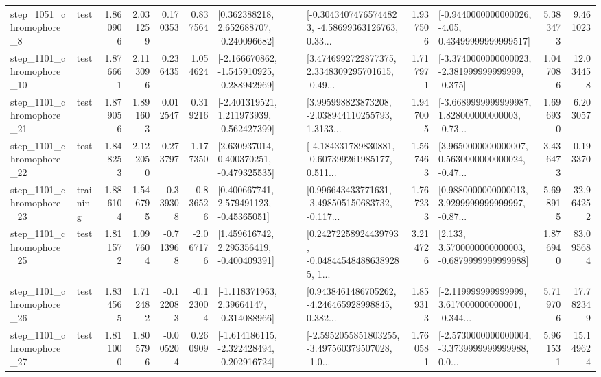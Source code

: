 \begin{tabular}{llrrrrllrlrr}
  step\_1051\_chromophore\_8 &      test &      1.860906 &    2.031259 &      0.170353 &  0.837564 &    [0.362388218, 2.652688707, -0.240096682] &  [-0.30434074765744823, -4.58699363126763, 0.33... &       1.937506 &  [-0.9440000000000026, -4.05, 0.43499999999999517] &            5.383473 &          9.461023 \\
 step\_1101\_chromophore\_10 &      test &      1.876661 &    2.113096 &      0.236435 &  1.054624 &  [-2.166670862, -1.545910925, -0.288942969] &  [3.4746992722877375, 2.3348309295701615, -0.49... &       1.717971 &  [-3.3740000000000023, -2.381999999999999, -0.375] &            1.047086 &         12.034458 \\
 step\_1101\_chromophore\_21 &      test &      1.879056 &    1.891603 &      0.012547 &  0.319216 &   [-2.401319521, 1.211973939, -0.562427399] &  [3.995998823873208, -2.038944110255793, 1.3133... &       1.947005 &  [-3.6689999999999987, 1.828000000000003, -0.73... &            1.696930 &          6.203057 \\
 step\_1101\_chromophore\_22 &      test &      1.848253 &    2.122050 &      0.273797 &  1.177350 &    [2.630937014, 0.400370251, -0.479325535] &  [-4.184331789830881, -0.607399261985177, 0.511... &       1.567463 &  [3.9650000000000007, 0.5630000000000024, -0.47... &            3.436473 &          0.193370 \\
 step\_1101\_chromophore\_23 &  training &      1.886104 &    1.546795 &     -0.339308 & -0.836526 &     [0.400667741, 2.579491123, -0.45365051] &  [0.996643433771631, -3.498505150683732, -0.117... &       1.767233 &  [0.9880000000000013, 3.9299999999999997, -0.87... &            5.698915 &         32.964252 \\
 step\_1101\_chromophore\_25 &      test &      1.811572 &    1.097604 &     -0.713968 & -2.067176 &    [1.459616742, 2.295356419, -0.400409391] &  [0.24272258924439793, -0.048445484886389285, 1... &       3.214726 &   [2.133, 3.5700000000000003, -0.6879999999999988] &            1.876940 &         83.095684 \\
 step\_1101\_chromophore\_26 &      test &      1.834565 &    1.712482 &     -0.122083 & -0.123004 &    [-1.118371963, 2.39664147, -0.314088966] &  [0.9438461486705262, -4.246465928998845, 0.382... &       1.859313 &  [-2.119999999999999, 3.617000000000001, -0.344... &            5.719706 &         17.782349 \\
 step\_1101\_chromophore\_27 &      test &      1.811000 &    1.805796 &     -0.005204 &  0.260909 &  [-1.614186115, -2.322428494, -0.202916724] &  [-2.5952055851803255, -3.497560379507028, -1.0... &       1.760581 &  [-2.5730000000000004, -3.3739999999999988, 0.0... &            5.961531 &         15.149624 \\

\end{tabular}
